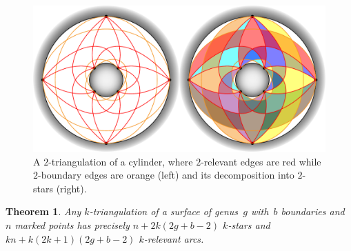 \documentclass{amsart}
\newtheorem{theorem}{Theorem}[section]
\theoremstyle{remark}
\newcommand*{\ktg}[0]{$k$-triangulation\xspace}
\begin{document}
\begin{figure}[t]
	\capstart
	\centerline{\includegraphics[scale=.5]{2triangCylinderStars}}
	\caption{A $2$-triangulation of a cylinder, where $2$-relevant edges are red while $2$-boundary edges are orange (left) and its decomposition into $2$-stars (right).}
	\label{fig:starsSurface}
\end{figure}

\begin{theorem}
\label{thm:structureSurface}
Any \ktg of a surface of genus~$g$ with~$b$ boundaries and~$n$ marked points has precisely $n + 2k(2g + b - 2)$ $k$-stars and $kn + k(2k + 1)(2g + b - 2)$ $k$-relevant arcs.
\end{theorem}
\end{document}
